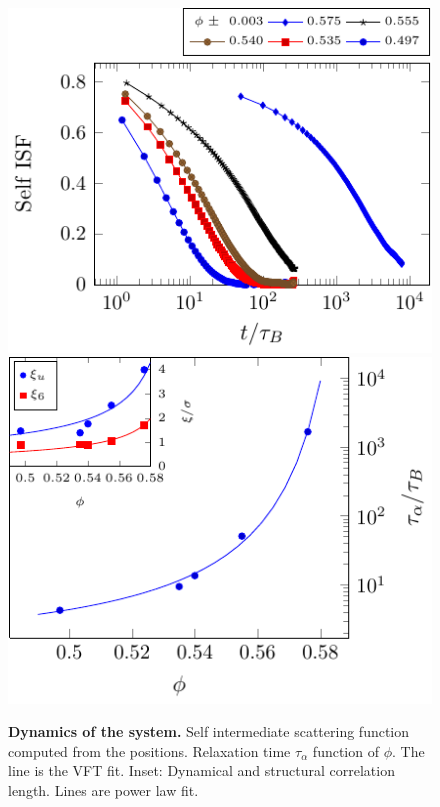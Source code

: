 \begin{figure}
\begin{center}
\includegraphics{generate_figures-figure0.pdf}
\includegraphics{generate_figures-figure1.pdf}
\end{center}
\caption{{\bf Dynamics of the system.} Self intermediate scattering function computed from the positions. Relaxation time $\tau_\alpha$ function of $\phi$. The line is the VFT fit. Inset: Dynamical and structural correlation length. Lines are power law fit.}
	\label{fig:vft}
\end{figure}

\clearpage

